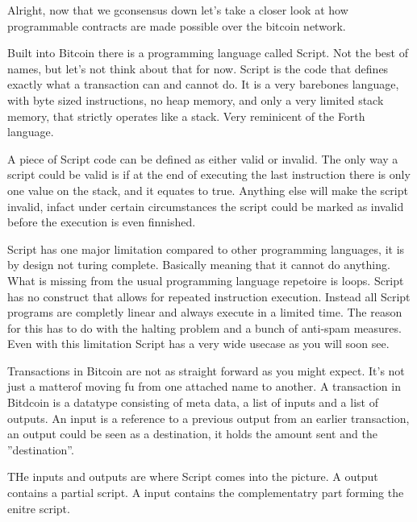 Alright, now that we gconsensus down let's take a closer look at how programmable contracts
are made possible over the bitcoin network.

Built into Bitcoin there is a programming language called Script. Not the best of names,
but let's not think about that for now. Script is the code that defines exactly what a transaction can and 
cannot do. It is a very barebones language, with byte sized instructions, no heap memory,
and only a very limited stack memory, that strictly operates like a stack. 
Very reminicent of the Forth language. 

A piece of Script code can be defined as either valid or invalid. The only 
way a script could be valid is if at the end of executing the last instruction
there is only one value on the stack, and it equates to true. Anything else
will make the script invalid, infact under certain circumstances the
script could be marked as invalid before the execution is even finnished.

Script has one major limitation compared to other programming languages, it is by design 
not turing complete. Basically meaning
that it cannot do anything. What is missing from the usual programming language repetoire
is loops. Script has no construct that allows for repeated instruction execution. 
Instead all Script programs are completly linear and always execute in a limited time.
The reason for this has to do with the halting problem and a bunch of anti-spam
measures. Even with this limitation Script has a very wide usecase as you will soon see.

Transactions in Bitcoin are not as straight forward as you might expect.
It's not just a matterof moving fu from one attached name to another.
A transaction in Bitdcoin is a datatype consisting of meta data, a list
of inputs and a list of outputs. An input is a reference to a previous
output from an earlier transaction, an output could be seen as a destination,
it holds the amount sent and the ''destination''. 

THe inputs and outputs are where Script comes into the picture.
A output contains a partial script. A input contains the 
complementatry part forming the enitre script.



